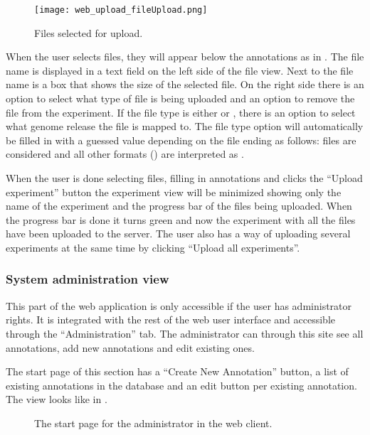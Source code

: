 \begin{figure}[h]
\centering
\texttt{[image: web\_upload\_fileUpload.png]}
\caption{\label{fig:web_upload_fileUpload}Files selected for upload.}
\end{figure}
 
When the user selects files, they will appear below the annotations as in . The file name is displayed in a text field on the left side of the file view. Next to the file name is a box that shows the size of the selected file. On the right side there is an option to select what type of file is being uploaded and an option to remove the file from the experiment. If the file type is either  or , there is an option to select what genome release the file is mapped to. The file type option will automatically be filled in with a guessed value depending on the file ending as follows:  files are considered  and all other formats () are interpreted as .

When the user is done selecting files, filling in annotations and clicks the “Upload experiment” button the experiment view will be minimized showing only the name of the experiment and the progress bar of the files being uploaded. When the progress bar is done it turns green and now the experiment with all the files have been uploaded to the server. The user also has a way of uploading several experiments at the same time by clicking “Upload all experiments”. 

\subsubsection{System administration view}

This part of the web application is only accessible if the user has administrator rights. It is integrated with the rest of the web user interface and accessible through the “Administration” tab. The administrator can through this site see all annotations, add new annotations and edit existing ones.

The start page of this section has a “Create New Annotation” button, a list of existing annotations in the database and an edit button per existing annotation. The view looks like in . 

\begin{figure}[h]
 \caption{The start page for the administrator in the web client.}
 \label{adm__web_annotationView}
\end{figure}

